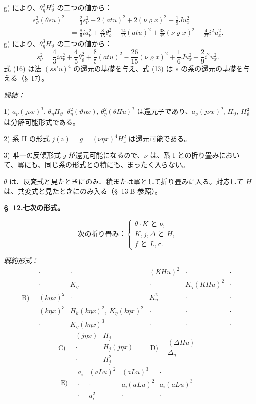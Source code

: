 \documentclass[11pt]{article}
\newcommand{\A}{\Delta}
\newcommand{\R}{\varrho}
\begin{document}
g) により、$\theta_\eta^2H_\vartheta^2$ の二つの値から：
\[
\tag{15}
\begin{aligned}
s_\vartheta^2(\theta su)^2
&=\frac23s_\nu^2-2(atu)^2+2(\nu\R x)^2-\frac19Ju_x^2\\
&=\frac89ia_\nu^2+\frac8{15}\theta_\R^2-\frac{14}{15}(atu)^2+\frac{38}{45}(\nu\R x)^2-\frac4{27}i^2u_x^2.
\end{aligned}
\]
g) により、$\theta_\eta^3H_\vartheta$ の二つの値から：
\[
\tag{16}
s_\nu^2=\frac43ia_\nu^2+\frac45\theta_\R^2+\frac85(atu)^2-\frac{26}{15}(\nu\R x)^2+\frac16Ju_x^2-\frac29i^2u_x^2.
\]
式 (16) は法 $(ss'u)^4$ の還元の基礎を与え、式 (13) は $s$ の系の還元の基礎を与える（\S\ 17）。

\noindent\emph{帰結：}

1) $a_\nu(j\nu x)^3$, $\theta_\eta H_\vartheta$, $\theta_\eta^2(\vartheta\eta x)$, $\theta_\eta^2(\theta Hu)^2$ は還元子であり、$a_\nu(j\nu x)^2$, $H_\vartheta$, $H_\vartheta^2$ は分解可能形式である。

2) 系 II の形式 $j(\nu)=g=(\nu\eta x)^4H_x^2$ は還元可能である。

3) 唯一の反傾形式 $g$ が還元可能になるので、$\nu$ は、系 I との折り畳みにおいて、冪にも、同じ系の形式との積にも、まったく入らない。

$\theta$ は、反変式と見たときにのみ、積または冪として折り畳みに入る。対応して $H$ は、共変式と見たときにのみ入る（\S\ 13 B 参照）。




\begin{center}
\textbf{\S\ 12.\quad 七次の形式。}
\end{center}
\[
\text{次の折り畳み：}\left\{\begin{array}{l}
\theta\cdot K\text{ と }\nu,\\
K,j,\A\text{ と }H,\\
f\text{ と }L,\sigma.
\end{array}\right.
\]

\noindent\emph{既約形式：}
\[
\text{B)}\quad
\begin{array}{c|c|c|c|c}
\cdot&\cdot&(KHu)^2&\cdot&\cdot\\
\cdot&K_\eta&\cdot&K_\eta(KHu)^2&\cdot\\
(k\eta x)^2&\cdot&K_\eta^2&\cdot&\cdot\\
(k\eta x)^3&H_k(k\eta x)^2,\ K_\eta(k\eta x)^2&\cdot&\cdot&\cdot\\
\cdot&K_\eta(k\eta x)^3&\cdot&\cdot&\cdot
\end{array}
\]
\[
\text{C)}\quad
\begin{array}{cc}
(j\eta x)&H_j\\
\cdot&H_j(j\eta x)\\
\cdot&H_j^2
\end{array}
\qquad
\text{D)}\quad
\begin{array}{c}
(\A Hu)\\\A_\eta
\end{array}
\]
\[
\text{E)}\quad
\begin{array}{cccc}
a_i&(aLu)^2&(aLu)^3&\cdot\\
\cdot&\cdot&a_i(aLu)^2&a_i(aLu)^3\\
\cdot&a_i^2&\cdot&\cdot
\end{array}
\]
\end{document}

